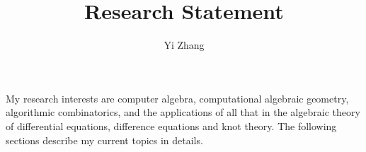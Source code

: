 \documentclass[10pt,a4paper]{article}
\begin{document}
\title{Research Statement}

\author{Yi Zhang}




\date{}
\maketitle

My research interests are computer algebra, computational algebraic geometry, algorithmic combinatorics, 
and the applications of all that in the algebraic theory of differential equations, difference equations and knot theory. 
The following sections describe my current topics in details. 
\end{document}
